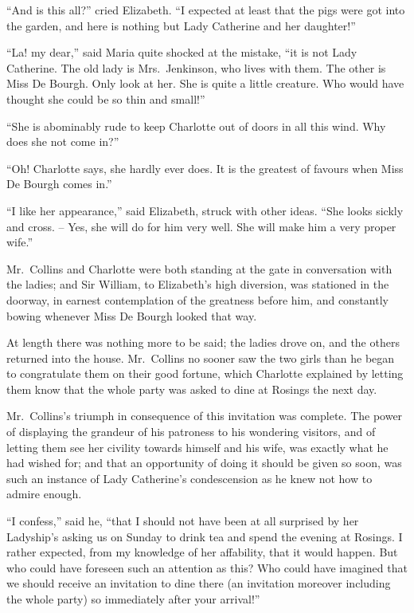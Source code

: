 “And is this all?” cried Elizabeth. “I expected at
least that the pigs were got into the garden, and here is
nothing but Lady Catherine and her daughter!”

“La! my dear,” said Maria quite shocked at the
mistake, “it is not Lady Catherine. The old lady is
Mrs.\ Jenkinson, who lives with them. The other is Miss
De Bourgh. Only look at her. She is quite a little
creature. Who would have thought she could be so thin
and small!”

“She is abominably rude to keep Charlotte out of doors
in all this wind. Why does she not come in?”

“Oh! Charlotte says, she hardly ever does. It is the
greatest of favours when Miss De Bourgh comes in.”

“I like her appearance,” said Elizabeth, struck with
other ideas. “She looks sickly and cross. -- Yes, she will
do for him very well. She will make him a very proper
wife.”

Mr.\ Collins and Charlotte were both standing at the
gate in conversation with the ladies; and Sir William,
to Elizabeth’s high diversion, was stationed in the doorway,
in earnest contemplation of the greatness before
him, and constantly bowing whenever Miss De Bourgh
looked that way.

At length there was nothing more to be said; the
ladies drove on, and the others returned into the house.
Mr.\ Collins no sooner saw the two girls than he began
to congratulate them on their good fortune, which Charlotte
explained by letting them know that the whole
party was asked to dine at Rosings the next day.


Mr.\ Collins’s triumph in consequence of this invitation
was complete. The power of displaying the grandeur of
his patroness to his wondering visitors, and of letting them
see her civility towards himself and his wife, was exactly
what he had wished for; and that an opportunity of
doing it should be given so soon, was such an instance of
Lady Catherine’s condescension as he knew not how to
admire enough.

“I confess,” said he, “that I should not have been at
all surprised by her Ladyship’s asking us on Sunday to
drink tea and spend the evening at Rosings. I rather
expected, from my knowledge of her affability, that it
would happen. But who could have foreseen such an
attention as this? Who could have imagined that we
should receive an invitation to dine there (an invitation
moreover including the whole party) so immediately after
your arrival!”


